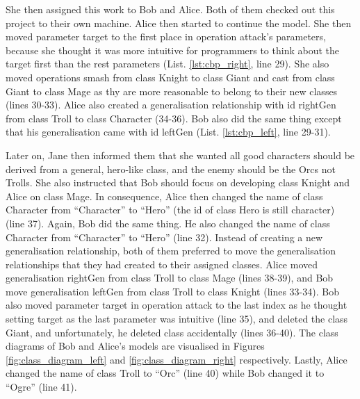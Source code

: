 She then assigned this work to Bob and Alice. Both of them checked out this project to their own machine. Alice then started to continue the model. She then moved parameter \textsf{target} to the first place in operation \textsf{attack}'s parameters, because she thought it was more intuitive for programmers to think about the \textsf{target} first than the rest parameters (List. \ref{lst:cbp_right}, line 29). She also moved operations \textsf{smash} from class \textsf{Knight} to class \textsf{Giant} and \textsf{cast} from class \textsf{Giant} to class \textsf{Mage} as thy are more reasonable to belong to their new classes (lines 30-33). Alice also created a generalisation relationship with id \textsf{rightGen} from class \textsf{Troll} to class \textsf{Character} (34-36). Bob also did the same thing except that his generalisation came with id \textsf{leftGen} (List. \ref{lst:cbp_left}, line 29-31). 

Later on, Jane then informed them that she wanted all good characters should be derived from a general, hero-like class, and the enemy should be the Orcs not Trolls. She also instructed that Bob should focus on developing class \textsf{Knight} and Alice on class \textsf{Mage}. In consequence, Alice then changed the name of class \textsf{Character} from ``Character'' to ``Hero'' (the id of class \textsf{Hero} is still \textsf{character}) (line 37). Again, Bob did the same thing. He also changed the name of class \textsf{Character} from ``Character'' to ``Hero'' (line 32). Instead of creating a new generalisation relationship, both of them preferred to move the generalisation relationships that they had created to their assigned classes. Alice moved generalisation \textsf{rightGen} from class \textsf{Troll} to class \textsf{Mage} (lines 38-39), and Bob move generalisation \textsf{leftGen} from class \textsf{Troll} to class \textsf{Knight} (lines 33-34). Bob also moved parameter \textsf{target} in operation \textsf{attack} to the last index as he thought setting target as the last parameter was intuitive (line 35), and deleted the class {Giant}, and unfortunately, he deleted class  accidentally (lines 36-40). The class diagrams of Bob and Alice's models are visualised in Figures \ref{fig:class_diagram_left} and \ref{fig:class_diagram_right} respectively. Lastly, Alice changed the \textsf{name} of class \textsf{Troll} to ``Orc'' (line 40) while Bob changed it to ``Ogre'' (line 41).  

